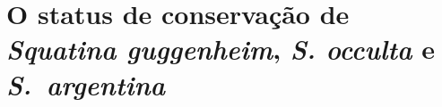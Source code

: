 \documentclass[a4paper,11pt,twoside,showtrims,onecolumn,openright,final]{memoir}
\begin{document}
% 


\section*{O status de conservação de \emph{Squatina guggenheim}, \emph{S. occulta} e \mbox{\emph{S. argentina}}}
\end{document}
